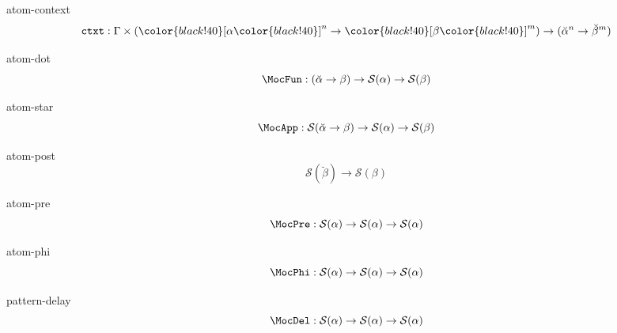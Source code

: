 \documentclass[preview]{standalone}
\begin{document}
\begin{docimage}{atom-context}
  \begin{equation*}%
    \mathtt{ctxt} : \Gamma \times ({\color{black!40}[}\alpha{\color{black!40}]}^n \rightarrow {\color{black!40}[}\beta{\color{black!40}]}^m )
    \rightarrow ({\breve{\alpha}^n \rightarrow \breve{\beta}^m})
  \end{equation*}
\end{docimage} 

\begin{docimage}{atom-dot}
  \begin{equation*}%
    \MocFun :
    ({\breve{\alpha} \rightarrow \beta})
    \rightarrow \mathcal{S}(\alpha) \rightarrow \mathcal{S}(\beta)
  \end{equation*}
\end{docimage} 

\begin{docimage}{atom-star}
  \begin{equation*}%
    \MocApp :
    \mathcal{S}({\breve{\alpha} \rightarrow \beta})
    \rightarrow \mathcal{S}(\alpha) \rightarrow \mathcal{S}(\beta)
  \end{equation*}
\end{docimage}

\begin{docimage}{atom-post}
  \begin{equation*}%
    \mathcal{S}({\breve{\beta}})
    \rightarrow \mathcal{S}(\beta)
  \end{equation*}
\end{docimage}

\begin{docimage}{atom-pre}
  \begin{equation*}%
    \MocPre : \mathcal{S}(\alpha) 
    \rightarrow \mathcal{S}(\alpha) \rightarrow \mathcal{S}(\alpha)
  \end{equation*}
\end{docimage}

\begin{docimage}{atom-phi}
  \begin{equation*}%
    \MocPhi :
    \mathcal{S}(\alpha)
    \rightarrow \mathcal{S}(\alpha) \rightarrow \mathcal{S}(\alpha)
  \end{equation*}
\end{docimage}


\begin{docimage}{pattern-delay}
  \begin{equation*}%
    \MocDel : \mathcal{S}(\alpha)
    \rightarrow \mathcal{S}(\alpha) \rightarrow \mathcal{S}(\alpha)
  \end{equation*}
\end{docimage}
\end{document}
